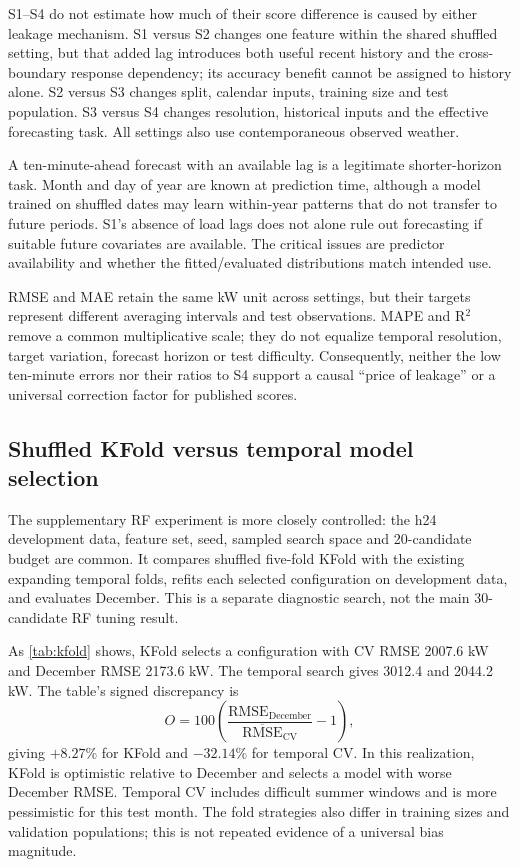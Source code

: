 S1--S4 do not estimate how much of their score difference is caused by either leakage mechanism. S1 versus S2 changes one feature within the shared shuffled setting, but that added lag introduces both useful recent history and the cross-boundary response dependency; its accuracy benefit cannot be assigned to history alone. S2 versus S3 changes split, calendar inputs, training size and test population. S3 versus S4 changes resolution, historical inputs and the effective forecasting task. All settings also use contemporaneous observed weather.

A ten-minute-ahead forecast with an available lag is a legitimate shorter-horizon task. Month and day of year are known at prediction time, although a model trained on shuffled dates may learn within-year patterns that do not transfer to future periods. S1's absence of load lags does not alone rule out forecasting if suitable future covariates are available. The critical issues are predictor availability and whether the fitted/evaluated distributions match intended use.

RMSE and MAE retain the same kW unit across settings, but their targets represent different averaging intervals and test observations. MAPE and R$^2$ remove a common multiplicative scale; they do not equalize temporal resolution, target variation, forecast horizon or test difficulty. Consequently, neither the low ten-minute errors nor their ratios to S4 support a causal ``price of leakage'' or a universal correction factor for published scores.

\subsection{Shuffled KFold versus temporal model selection}
The supplementary RF experiment is more closely controlled: the h24 development data, feature set, seed, sampled search space and 20-candidate budget are common. It compares shuffled five-fold KFold with the existing expanding temporal folds, refits each selected configuration on development data, and evaluates December. This is a separate diagnostic search, not the main 30-candidate RF tuning result.


As \cref{tab:kfold} shows, KFold selects a configuration with CV RMSE \num{2007.6} kW and December RMSE \num{2173.6} kW. The temporal search gives \num{3012.4} and \num{2044.2} kW. The table's signed discrepancy is
\begin{equation}
O=100\left(\frac{\mathrm{RMSE}_{\mathrm{December}}}{\overline{\mathrm{RMSE}}_{\mathrm{CV}}}-1\right),
\label{eq:optimism}
\end{equation}
giving $+\num{8.27}\%$ for KFold and $-\num{32.14}\%$ for temporal CV. In this realization, KFold is optimistic relative to December and selects a model with worse December RMSE. Temporal CV includes difficult summer windows and is more pessimistic for this test month. The fold strategies also differ in training sizes and validation populations; this is not repeated evidence of a universal bias magnitude.

